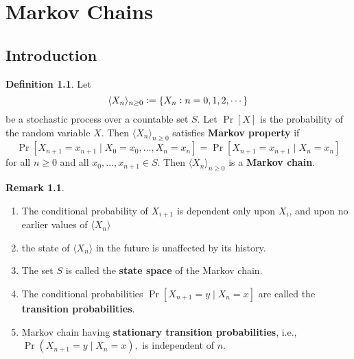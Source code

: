 \documentclass[12pt,openany]{book}
\theoremstyle{definition}
\newtheorem{definition}{Definition}[chapter]
\newtheorem{remark}{Remark}[chapter]
\newcommand{\ie}{\textnormal{i.e.}}
\newcommand{\markov}[1]{\langle #1\rangle}
\begin{document}
	\newpage
	\chapter{Markov Chains}
	
	\section{Introduction}
	\begin{tcolorbox}[colback=white,colframe=defcolor,arc=5pt,title={\color{white}\bf Markov Chain}]
		\begin{definition}
			Let $$
			\langle X_n\rangle_{n\geq 0}:=\set{X_n:n=0,1,2,\cdots}
			$$ be a stochastic process over a countable set $S$. Let $\Pr[X]$ is the probability of the random variable $X$. Then $\langle X_n\rangle_{n\geq 0}$ satisfies \textbf{Markov property} if \[
			\Pr[X_{n+1}=x_{n+1}\mid X_0=x_0,\dots,X_n=x_n]=\Pr[X_{n+1}=x_{n+1}\mid X_n=x_n]
			\] for all $n\geq 0$ and all $x_0,\dots, x_{n+1}\in S$. Then $\markov{X_n}_{n\geq 0}$ is a \textbf{Markov chain}.
		\end{definition}
	\end{tcolorbox}
	\begin{remark}
		\ \begin{enumerate}[(1)]
			\item The conditional probability of $X_{i+1}$ is dependent only upon $X_i$, and upon no earlier values of $\markov{X_n}$
			\item the state of $\markov{X_n}$ in the future is unaffected by its history.
			\item The set $S$ is called the \textbf{state space} of the Markov chain.
			\item The conditional probabilities $\Pr[X_{n+1}= y\mid X_n = x]$ are called the \textbf{transition probabilities}.
			\item Markov chain having \textbf{stationary transition probabilities}, \ie, $\Pr(X_{n+1}=y\mid X_n=x),$ is independent of $n$.
		\end{enumerate}
	\end{remark}
	\vspace{20pt}
	\newpage
\end{document}
